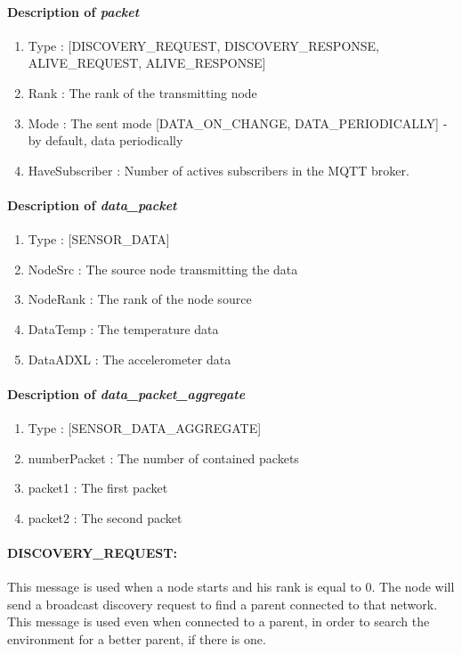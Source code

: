\documentclass[a4paper,10pt]{article}
\begin{document}
\paragraph{Description of \textit{packet}}
\begin{enumerate}
\item Type : [DISCOVERY\_REQUEST, DISCOVERY\_RESPONSE, ALIVE\_REQUEST, ALIVE\_RESPONSE]
\item Rank : The rank of the transmitting node
\item Mode : The sent mode [DATA\_ON\_CHANGE, DATA\_PERIODICALLY] - by default, data periodically 
\item HaveSubscriber : Number of actives subscribers in the MQTT broker.
\end{enumerate}

\paragraph{Description of \textit{data\_packet} }
\begin{enumerate}
\item Type : [SENSOR\_DATA]
\item NodeSrc :  The source node transmitting the data
\item NodeRank : The rank of the node source
\item DataTemp : The temperature data
\item DataADXL : The accelerometer data
\end{enumerate}

\paragraph{Description of \textit{data\_packet\_aggregate} }
\begin{enumerate}
\item Type : [SENSOR\_DATA\_AGGREGATE]
\item numberPacket : The number of contained packets
\item packet1 :  The first packet
\item packet2 : The second packet
\end{enumerate}

\paragraph{DISCOVERY\_REQUEST:}  This message is used when a node starts and his rank is equal to 0. The node will send a broadcast discovery request to find a parent connected to that network. This message is used even when connected to a parent, in order to search the environment for a better parent, if there is one.
\end{document}
